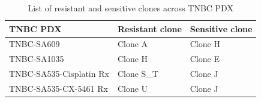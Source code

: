  \begin{table}[htbp]
   
   \centering
   \caption{List of resistant and sensitive clones across TNBC PDX}
     \begin{tabular}{|l|l|l|}
      \hline
     TNBC PDX & Resistant clone & Sensitive clone \\
     \hline
     TNBC-SA609  & Clone A & Clone H \\
     TNBC-SA1035 & Clone H & Clone E \\
     TNBC-SA535-Cisplatin Rx & Clone S\_T & Clone J \\
     TNBC-SA535-CX-5461 Rx & Clone U & Clone J \\    \hline
     \end{tabular}%
   \label{tab:Listofresistantandsensitiveclones}%
   
 \end{table}%


